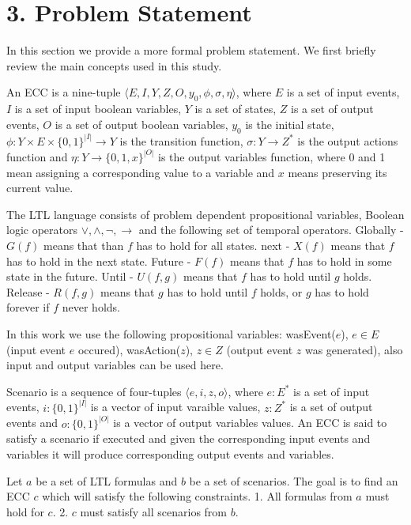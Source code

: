 \documentclass[fleqn,twocolumn]{article}
\begin{document}
\section{3. Problem Statement}

In this section we provide a more formal problem statement. We first briefly review the main concepts used in this study.

An ECC is a nine-tuple $\langle E, I, Y, Z, O, y_0, \phi, \sigma, \eta \rangle$, where $E$ is a set of input events,
$I$ is a set of input boolean variables, $Y$ is a set of states, $Z$ is a set of output events, $O$ is a set of output boolean variables,
$y_0$ is the initial state, $\phi : Y \times E \times \{0,1\}^{|I|} \rightarrow Y$ is the transition function,
$\sigma : Y \rightarrow Z^*$ is the output actions function and $\eta : Y \rightarrow \{0,1,x\}^{|O|}$ is the output variables function,
where 0 and 1 mean assigning a corresponding value to a variable and $x$ means preserving its current value.

The LTL language consists of problem dependent propositional variables, Boolean logic operators $\vee, \wedge, \lnot, \rightarrow$
and the following set of temporal operators. Globally - $G(f)$ means that than $f$ has to hold for all states. next - $X(f)$ means
that $f$ has to hold in the next state. Future - $F(f)$ means that $f$ has to hold in some state in the future. Until - $U(f, g)$
means that $f$ has to hold until $g$ holds. Release - $R(f, g)$ means that $g$ has to hold until $f$ holds, or $g$ has to hold
forever if $f$ never holds.

In this work we use the following propositional variables: wasEvent($e$), $e \in E$ (input event $e$ occured), wasAction($z$),
$z \in Z$ (output event $z$ was generated), also input and output variables can be used here.

Scenario is a sequence of four-tuples $\langle e, i, z, o \rangle$, where $e : E^*$ is a set of input events, $i : \{0,1\}^{|I|}$ is
a vector of input varaible values, $z : Z^*$ is a set of output events and $o : \{0,1\}^{|O|}$ is a vector of output variables values.
An ECC is said to satisfy a scenario if executed and given the corresponding input events and variables it will produce corresponding
output events and variables.

Let $a$ be a set of LTL formulas and $b$ be a set of scenarios. The goal is to find an ECC $c$ which will satisfy the following constraints.
1. All formulas from $a$ must hold for $c$.
2. $c$ must satisfy all scenarios from $b$.
\end{document}
